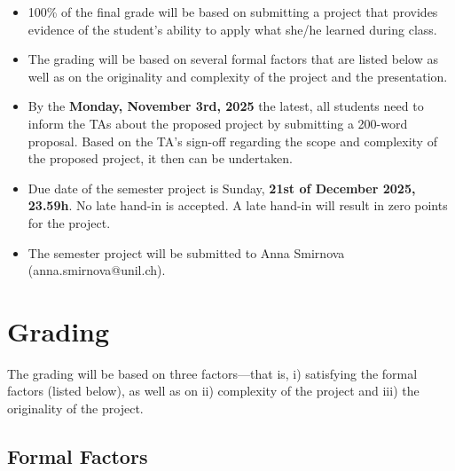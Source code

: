 \documentclass[12pt]{article} %
\begin{document}
\begin{itemize}

 \item 100\% of the final grade will be based on submitting a project that 
provides evidence of the student's ability to apply what she/he learned 
during class.

\item The grading will be based on several formal factors that are listed 
below as well as on the originality and complexity of the project and the presentation.


\item By the {\bf{Monday, November 3rd, 2025}} the latest, all students need to inform the TAs about
the proposed project by submitting a 200-word proposal. 
Based on the TA's sign-off regarding the scope and complexity
of the proposed project, it then can be undertaken.

\item Due date of the semester project is Sunday, {\bf{21st of December 2025, 23.59h}}.
No late hand-in is accepted.
A late hand-in will result in zero points for the project.

\item The semester project will be submitted to Anna Smirnova (anna.smirnova@unil.ch).


\end{itemize}









\section{Grading}



The grading will be based on three factors---that is, 
i) satisfying the formal factors (listed below), as well as on ii) complexity of 
the project and iii) the originality of the project.


\subsection{Formal Factors}
\end{document}
